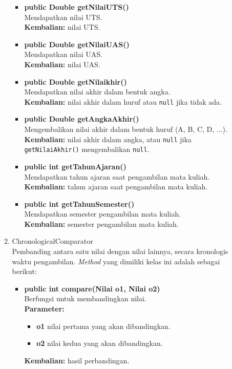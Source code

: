 \begin{enumerate}
\begin{enumerate}
\begin{itemize}
			\item \textbf{public Double getNilaiUTS()}\\
				Mendapatkan nilai UTS.\\
				\textbf{Kembalian:} nilai UTS.
				
			\item \textbf{public Double getNilaiUAS()}\\
				Mendapatkan nilai UAS.\\
				\textbf{Kembalian:} nilai UAS.
				
			\item \textbf{public Double getNilaikhir()}\\
				Mendapatkan nilai akhir dalam bentuk angka.\\
				\textbf{Kembalian:} nilai akhir dalam huruf atau \texttt{null} jika tidak ada.
			
			\item \textbf{public Double getAngkaAkhir()}\\
				Mengembalikan nilai akhir dalam bentuk huruf (A, B, C, D, ...).\\
				\textbf{Kembalian:} nilai akhir dalam angka, atau \texttt{null} jika \texttt{getNilaiAkhir()} mengembalikan \texttt{null}.
			
			\item \textbf{public int getTahunAjaran()}\\
				Mendapatkan tahun ajaran saat pengambilan mata kuliah.\\
				\textbf{Kembalian:} tahun ajaran saat pengambilan mata kuliah.
			
			\item \textbf{public int getTahunSemester()}\\
				Mendapatkan semester pengambilan mata kuliah.\\
				\textbf{Kembalian:} semester pengambilan mata kuliah.	
		\end{itemize}
		
		\item ChronologicalComparator\\
		Pembanding antara satu nilai dengan nilai lainnya, secara kronologis waktu pengambilan. \textit{Method} yang dimiliki kelas ini adalah sebagai berikut:
		
		\begin{itemize}
			\item \textbf{public int compare(Nilai o1, Nilai o2) } \\
			Berfungsi untuk membandingkan nilai. \\
			\textbf{Parameter:}
			\begin{itemize}
				\item \textbf{o1} nilai pertama yang akan dibandingkan.
				\item \textbf{o2} nilai kedua yang akan dibandingkan.
			\end{itemize}
			\textbf{Kembalian:} hasil perbandingan.
		\end{itemize}
		

\end{enumerate}
\end{enumerate}
